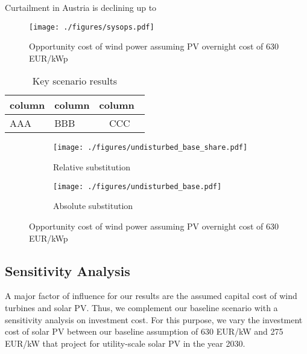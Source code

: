 \documentclass[review, 3p, times]{elsarticle} %
\begin{document}
    Curtailment in Austria is declining up to

    \begin{figure*}
        \centering
        \texttt{[image: ./figures/sysops.pdf]}
        \caption{Opportunity cost of wind power assuming PV overnight cost of 630 EUR/kWp}
        \label{figure:system-operation-base}
    \end{figure*}



    \begin{table}
        \caption{Key scenario results}
        \begin{tabulary}{\textwidth}{LLC}
            \toprule
            column & column & column \\
\midrule
AAA & BBB & CCC \\
\bottomrule
\end{tabulary}
\end{table}

\begin{figure*}
\centering
\begin{subfigure}[b]{0.475\textwidth}
\centering
\texttt{[image: ./figures/undisturbed\_base\_share.pdf]}
\caption{Relative substitution}
\label{fig:rel_substitution}
\end{subfigure}
\hfill
\begin{subfigure}[b]{0.475\textwidth}
\centering
\texttt{[image: ./figures/undisturbed\_base.pdf]}
\caption{Absolute substitution}
\label{fig::abs_substitution}
\end{subfigure}
\caption{Opportunity cost of wind power assuming PV overnight cost of 630 EUR/kWp}
\label{figure:opportunity-cost-base}
\end{figure*}

\subsection{Sensitivity Analysis} \label{subsec:sensitivity}
A major factor of influence for our results are the assumed capital cost of wind turbines and solar PV.
Thus, we complement our baseline scenario with a sensitivity analysis on investment cost.
For this purpose, we vary the investment cost of solar PV between our baseline assumption of 630 EUR/kW and 275
EUR/kW that \cite{Vartiainen2019} project for utility-scale solar PV in the year 2030.
\end{document}
